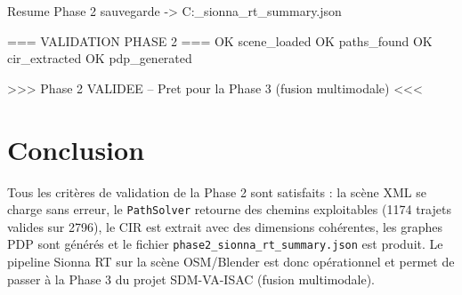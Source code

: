 \documentclass[11pt,a4paper]{article}
\begin{document}
\begin{consoleout}
Resume Phase 2 sauvegarde -> C:\Users\AdminFix\Desktop\PFA{}_sionna_rt_summary.json

=== VALIDATION PHASE 2 ===
  OK  scene_loaded
  OK  paths_found
  OK  cir_extracted
  OK  pdp_generated

>>> Phase 2 VALIDEE -- Pret pour la Phase 3 (fusion multimodale) <<<
\end{consoleout}

\section{Conclusion}

Tous les critères de validation de la Phase 2 sont satisfaits : la scène XML se charge sans erreur, le \texttt{PathSolver} retourne des chemins exploitables (1174 trajets valides sur 2796), le CIR est extrait avec des dimensions cohérentes, les graphes PDP sont générés et le fichier \texttt{phase2\_sionna\_rt\_summary.json} est produit. Le pipeline Sionna RT sur la scène OSM/Blender est donc opérationnel et permet de passer à la Phase 3 du projet SDM-VA-ISAC (fusion multimodale).
\end{document}
